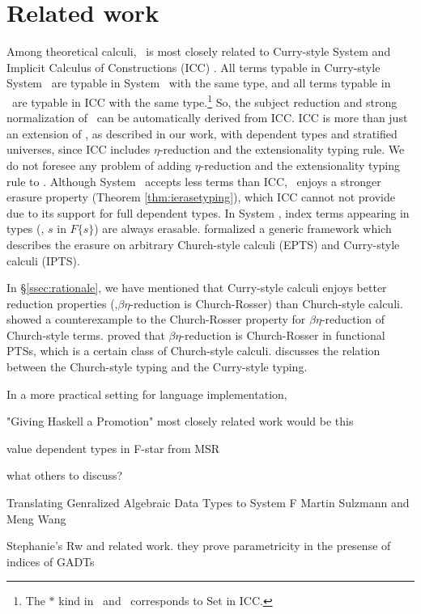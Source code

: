 \section{Related work}
\label{sec:relwork}
Among theoretical calculi, \Fi\ is most closely related to
Curry-style System \Fw \cite{AbeMatUus03,AbeMatUus05,GHR93}
and Implicit Calculus of Constructions (ICC) \cite{Miquel01}.
All terms typable in Curry-style System \Fw\ are typable in System \Fi\ 
with the same type, and all terms typable in \Fi\ are typable in ICC
with the same type.\footnote{The $*$ kind in \Fw\ and \Fi\ corresponds
	to \textsf{Set} in ICC.}
So, the subject reduction and strong normalization of \Fi\ 
can be automatically derived from ICC. ICC is more than just an extension of
\Fi, as described in our work, with dependent types and stratified universes,
since ICC includes $\eta$-reduction and the extensionality typing rule.
We do not foresee any problem of adding $\eta$-reduction and
the extensionality typing rule to \Fi. Although System \Fi\ accepts
less terms than ICC, \Fi\ enjoys a stronger erasure property
(Theorem \ref{thm:ierasetyping}), which ICC cannot not provide
due to its support for full dependent types. In System \Fi, index terms
appearing in types (\eg, $s$ in $F\{s\}$) are always erasable.
\citet{LingerS08} formalized a generic framework which describes the erasure on
arbitrary Church-style calculi (EPTS) and Curry-style calculi (IPTS).

In \S\ref{ssec:rationale}, we have mentioned that Curry-style calculi enjoys
better reduction properties (\eg,$\beta\eta$-reduction is Church-Rosser)
than Church-style calculi. \citet{Nederpelt73} showed a counterexample to
the Church-Rosser property for $\beta\eta$-reduction of Church-style terms.
\citet{Geuvers92} proved that $\beta\eta$-reduction is Church-Rosser
in functional PTSs, which is a certain class of Church-style calculi.
\citet{Seldin08} discusses the relation between the Church-style typing
and the Curry-style typing.

In a more practical setting for language implementation,

\citet{YorgeyWCJVM12}
"Giving Haskell a Promotion" 
most closely related work would be this

\citet{Swamy11}
value dependent types in F-star  from MSR


what others to discuss?

Translating Genralized Algebraic Data Types to System F
Martin Sulzmann and Meng Wang

Stephanie's Rw and related work.
they prove parametricity in the presense of indices of GADTs
